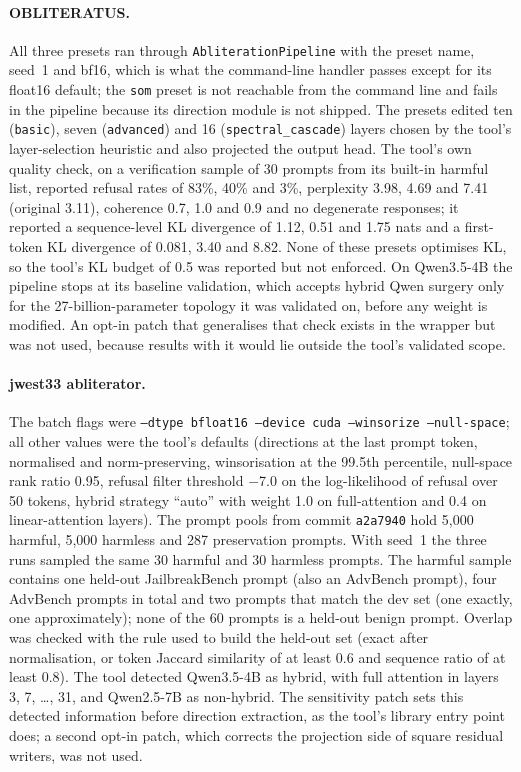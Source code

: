 \paragraph{OBLITERATUS.} All three presets ran through \texttt{AbliterationPipeline} with the preset name, seed~1
and bf16, which is what the command-line handler passes except for its float16 default; the \texttt{som} preset is
not reachable from the command line and fails in the pipeline because its direction module is not shipped. The
presets edited ten (\texttt{basic}), seven (\texttt{advanced}) and 16 (\texttt{spectral\_cascade}) layers chosen by
the tool's layer-selection heuristic and also projected the output head. The tool's own quality check, on a
verification sample of 30 prompts from its built-in harmful list, reported refusal rates of 83\%, 40\% and 3\%,
perplexity 3.98, 4.69 and 7.41 (original 3.11), coherence 0.7, 1.0 and 0.9 and no degenerate responses; it reported
a sequence-level KL divergence of 1.12, 0.51 and 1.75 nats and a first-token KL divergence of 0.081, 3.40 and 8.82.
None of these presets optimises KL, so the tool's KL budget of 0.5 was reported but not enforced. On Qwen3.5-4B the
pipeline stops at its baseline validation, which accepts hybrid Qwen surgery only for the 27-billion-parameter
topology it was validated on, before any weight is modified. An opt-in patch that generalises that check exists in
the wrapper but was not used, because results with it would lie outside the tool's validated scope.

\paragraph{jwest33 abliterator.} The batch flags were \texttt{--dtype bfloat16 --device cuda --winsorize
--null-space}; all other values were the tool's defaults (directions at the last prompt token, normalised and
norm-preserving, winsorisation at the 99.5th percentile, null-space rank ratio 0.95, refusal filter threshold
$-$7.0 on the log-likelihood of refusal over 50 tokens, hybrid strategy ``auto'' with weight 1.0 on full-attention
and 0.4 on linear-attention layers). The prompt pools from commit \texttt{a2a7940} hold 5{,}000 harmful, 5{,}000
harmless and 287 preservation prompts. With seed~1 the three runs sampled the same 30 harmful and 30 harmless
prompts. The harmful sample contains one held-out JailbreakBench prompt (also an AdvBench prompt), four AdvBench
prompts in total and two prompts that match the dev set (one exactly, one approximately); none of the 60 prompts is
a held-out benign prompt. Overlap was checked with the rule used to build the held-out set (exact after normalisation,
or token Jaccard similarity of at least 0.6 and sequence ratio of at least 0.8). The tool detected Qwen3.5-4B as
hybrid, with full attention in layers 3, 7, \ldots, 31, and Qwen2.5-7B as non-hybrid. The sensitivity patch sets this
detected information before direction extraction, as the tool's library entry point does; a second opt-in patch,
which corrects the projection side of square residual writers, was not used.

